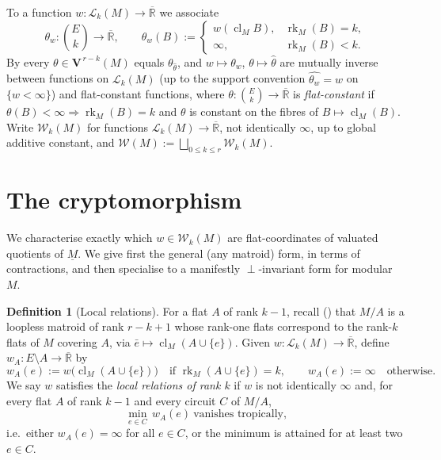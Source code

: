 \documentclass{article}
\theoremstyle{definition}
\newtheorem{definition}[theorem]{Definition}
\newcommand{\Rbar}{\overline{\mathbb{R}}}
\newcommand{\rk}{\operatorname{rk}}
\newcommand{\cl}{\operatorname{cl}}
\newcommand{\bV}{\mathbf V}
\newcommand{\cLL}{\mathcal{L}}
\newcommand{\cW}{\mathcal{W}}
\begin{document}
To a function $w\colon\cLL_k(M)\to\Rbar$ we associate
\begin{equation}\label{eqn:thetaw}
  \theta_w\colon\binom{E}{k}\to\Rbar,\qquad
  \theta_w(B):=\begin{cases}w(\cl_M B), & \rk_M(B)=k,\\ \infty, & \rk_M(B)<k.\end{cases}
\end{equation}
By  every $\theta\in\bV^{\,r-k}(M)$ equals $\theta_{\widehat\theta}$, and
$w\mapsto\theta_w$, $\theta\mapsto\widehat\theta$ are mutually inverse between functions on
$\cLL_k(M)$ (up to the support convention $\widehat{\theta_w}=w$ on $\{w<\infty\}$) and flat-constant
functions, where $\theta\colon\binom{E}{k}\to\Rbar$ is \emph{flat-constant} if
$\theta(B)<\infty\Rightarrow\rk_M(B)=k$ and $\theta$ is constant on the fibres of $B\mapsto\cl_M(B)$.
Write $\cW_k(M)$ for functions $\cLL_k(M)\to\Rbar$, not identically $\infty$, up to global additive
constant, and $\cW(M):=\bigsqcup_{0\le k\le r}\cW_k(M)$.

\section{The cryptomorphism}\label{sec:crypto}

We characterise exactly which $w\in\cW_k(M)$ are flat-coordinates of valuated quotients of $\underline
M$. We give first the general (any matroid) form, in terms of contractions, and then specialise to a
manifestly $\perp$-invariant form for modular $M$.

\begin{definition}[Local relations]\label{def:local}
For a flat $A$ of rank $k-1$, recall () that $M/A$ is a loopless matroid of
rank $r-k+1$ whose rank-one flats correspond to the rank-$k$ flats of $M$ covering $A$, via
$\bar e\mapsto\cl_M(A\cup\{e\})$. Given $w\colon\cLL_k(M)\to\Rbar$, define
$w_A\colon E\setminus A\to\Rbar$ by
\[
  w_A(e):=w\bigl(\cl_M(A\cup\{e\})\bigr)\quad\text{if }\rk_M(A\cup\{e\})=k,\qquad
  w_A(e):=\infty\quad\text{otherwise.}
\]
We say $w$ satisfies the \emph{local relations of rank $k$} if $w$ is not identically $\infty$ and,
for every flat $A$ of rank $k-1$ and every circuit $C$ of $M/A$,
\begin{equation}\label{eqn:local}
  \min_{e\in C}\,w_A(e)\ \text{vanishes tropically,}
\end{equation}
i.e.\ either $w_A(e)=\infty$ for all $e\in C$, or the minimum is attained for at least two $e\in C$.
\end{definition}
\end{document}
